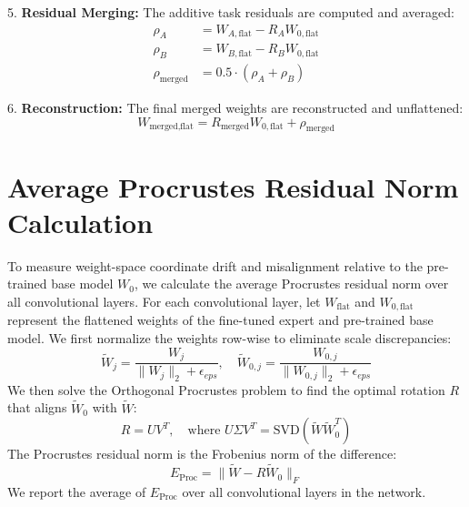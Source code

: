 \documentclass{article}
\theoremstyle{plain}
\theoremstyle{definition}
\theoremstyle{remark}
\begin{document}
5. \textbf{Residual Merging:} The additive task residuals are computed and averaged:
\begin{align}
    \rho_A &= W_{A,\text{flat}} - R_A W_{0,\text{flat}} \\
    \rho_B &= W_{B,\text{flat}} - R_B W_{0,\text{flat}} \\
    \rho_{\text{merged}} &= 0.5 \cdot (\rho_A + \rho_B)
\end{align}

6. \textbf{Reconstruction:} The final merged weights are reconstructed and unflattened:
\begin{equation}
    W_{\text{merged},\text{flat}} = R_{\text{merged}} W_{0,\text{flat}} + \rho_{\text{merged}}
\end{equation}

\section{Average Procrustes Residual Norm Calculation}
\label{app-procrustes}
To measure weight-space coordinate drift and misalignment relative to the pre-trained base model $W_0$, we calculate the average Procrustes residual norm over all convolutional layers.
For each convolutional layer, let $W_{\text{flat}}$ and $W_{0,\text{flat}}$ represent the flattened weights of the fine-tuned expert and pre-trained base model. We first normalize the weights row-wise to eliminate scale discrepancies:
\begin{equation}
    \tilde{W}_j = \frac{W_j}{\|W_j\|_2 + \epsilon_{eps}}, \quad \tilde{W}_{0,j} = \frac{W_{0,j}}{\|W_{0,j}\|_2 + \epsilon_{eps}}
\end{equation}
We then solve the Orthogonal Procrustes problem to find the optimal rotation $R$ that aligns $\tilde{W}_0$ with $\tilde{W}$:
\begin{equation}
    R = U V^T, \quad \text{where } U \Sigma V^T = \text{SVD}(\tilde{W} \tilde{W}_0^T)
\end{equation}
The Procrustes residual norm is the Frobenius norm of the difference:
\begin{equation}
    E_{\text{Proc}} = \|\tilde{W} - R \tilde{W}_0\|_F
\end{equation}
We report the average of $E_{\text{Proc}}$ over all convolutional layers in the network.
\end{document}
